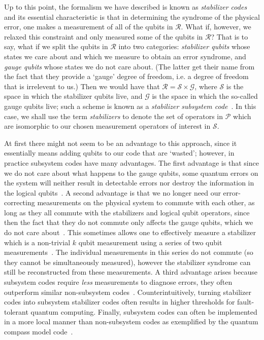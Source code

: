 \documentclass[twocolumn,showpacs,preprintnumbers,amsmath,amssymb,nofootinbib,pra,floatfix]{revtex4-1}
\begin{document}
Up to this point, the formalism we have described is known as \emph{stabilizer codes}~\cite{Gottesman:96a,Gottesman:97a,Calderbank:97a,Calderbank:97b} and its essential characteristic is that in determining the syndrome of the physical error, one makes a measurement of all of the qubits in $\mathscr{R}$. What if, however, we relaxed this constraint and only measured some of the qubits in $\mathscr{R}$?  That is to say, what if we split the qubits in $\mathscr{R}$ into two categories: \emph{stabilizer
qubits} whose states we care about and which we measure to obtain an error syndrome, and \emph{gauge
qubits} whose states we do not care about.  (The latter get their name
from the fact that they provide a `gauge' degree of freedom, i.e. a
degree of freedom that is irrelevent to us.)  Then we would have that
$\mathscr{R}=\mathscr{S}\times \mathscr{G}$, where $\mathscr{S}$ is
the space in which the stabilizer qubits live, and $\mathscr{G}$ is
the space in which the so-called gauge qubits live; such a scheme is
known as a \emph{stabilizer subsystem code}~\cite{Poulin:05a}.  In this case, we shall use the term
\emph{stabilizers} to denote the set of operators in $\mathscr{P}$ which are isomorphic to our chosen measurement operators of interest in $\mathscr{S}$.

At first there might not seem to be an advantage to this approach, since it essentially means adding qubits to our code that are
`wasted'; however, in practice subsystem codes have many advantages.  The first advantage is that since we do not care about what happens to the gauge qubits, some quantum errors on the system will neither result in detectable errors nor destroy the information in the logical qubits~\cite{Poulin:05a,Kribs:05a,Kribs:05b,Kribs:06a,Bacon:06a}.  A second advantage is that we no longer need our error-correcting measurements on the physical system to commute with each other, as long as they all commute with the stabilizers and logical qubit operators, since then the fact that they do not commute only affects the gauge qubits, which we do not care about~\cite{Aliferis:07a}.  This sometimes allows one to effectively measure a stabilizer which is a non-trivial $k$ qubit measurement using a series of two qubit measurements~\cite{Aliferis:07a}.  The individual measurements in this series do not commute (so they cannot be simultaneously measured), however the stabilizer syndrome can still be reconstructed from these measurements.  A third advantage arises because subsystem codes require {\em less} measurements to diagnose errors, they often outperform similar non-subsystem codes~\cite{Aliferis:07a,Cross:07a}.  Counterintuitively, turning stabilizer codes into subsystem stabilizer codes often results in higher thresholds for fault-tolerant quantum computing.  Finally, subsystem codes can often be implemented in a more local manner than non-subsystem codes as exemplified by the quantum compass model code~\cite{Bacon:06a,Aliferis:07a}.
\end{document}
